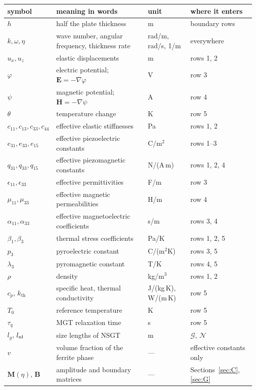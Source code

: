 \documentclass[11pt,a4paper]{article}
\newcommand{\Nc}{\mathcal{N}}
\newcommand{\Gc}{\mathcal{G}}
\newcommand{\kB}{k_{\mathrm{th}}}
\newcommand{\aME}{\alpha}
\begin{document}
\begin{center}\footnotesize
\begin{tabular}{p{2.0cm}p{5.6cm}p{1.9cm}p{4.6cm}}
\toprule
symbol & meaning in words & unit & where it enters\\
\midrule
$h$ & half the plate thickness & m & boundary rows\\
$k,\omega,\eta$ & wave number, angular frequency, thickness rate & rad/m, rad/s, 1/m & everywhere\\
$u_x,u_z$ & elastic displacements & m & rows 1, 2\\
$\varphi$ & electric potential; $\mathbf E=-\nabla\varphi$ & V & row 3\\
$\psi$ & magnetic potential; $\mathbf H=-\nabla\psi$ & A & row 4\\
$\theta$ & temperature change & K & row 5\\
$c_{11},c_{13},c_{33},c_{44}$ & effective elastic stiffnesses & Pa & rows 1, 2\\
$e_{31},e_{33},e_{15}$ & effective piezoelectric constants & C/m$^2$ & rows 1--3\\
$q_{31},q_{33},q_{15}$ & effective piezomagnetic constants & N/(A\,m) & rows 1, 2, 4\\
$\epsilon_{11},\epsilon_{33}$ & effective permittivities & F/m & row 3\\
$\mu_{11},\mu_{33}$ & effective magnetic permeabilities & H/m & row 4\\
$\aME_{11},\aME_{33}$ & effective magnetoelectric coefficients & s/m & rows 3, 4\\
$\beta_1,\beta_3$ & thermal stress coefficients & Pa/K & rows 1, 2, 5\\
$p_3$ & pyroelectric constant & C/(m$^2$K) & rows 3, 5\\
$\lambda_3$ & pyromagnetic constant & T/K & rows 4, 5\\
$\rho$ & density & kg/m$^3$ & rows 1, 2\\
$c_p$, $\kB$ & specific heat, thermal conductivity & J/(kg\,K), W/(m\,K) & row 5\\
$T_0$ & reference temperature & K & row 5\\
$\tau_q$ & MGT relaxation time & s & row 5\\
$l_g$, $l_{\rm nl}$ & size lengths of NSGT & m & $\Gc$, $\Nc$\\
$v$ & volume fraction of the ferrite phase & --- & effective constants only\\
$\mathbf M(\eta)$, $\mathbf B$ & amplitude and boundary matrices & --- & Sections~\ref{sec:C}, \ref{sec:G}\\
\bottomrule
\end{tabular}
\end{center}
\end{document}
